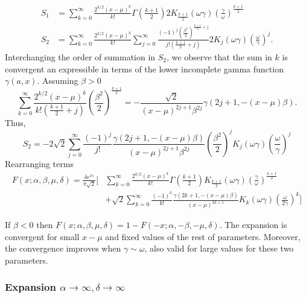 \documentclass[10pt,a4paper,oneside]{article}
\numberwithin{equation}{section}
\begin{document}
\begin{align}
S_1 &= \sum_{k=0}^{\infty}\frac{2^{k/2}(x-\mu)^k}{k!} \Gamma\left(\frac{k+1}{2}\right)2 K_{\frac{k+1}{2}}(\omega \gamma) \left(\frac{\gamma}{\omega}\right)^{\frac{k+1}{2}}\\
S_2 &= \sum_{k=0}^{\infty}\frac{2^{k/2}(x-\mu)^k}{k!}\sum_{j=0}^{\infty}\frac{(-1)^j \left(\frac{\beta^2}{2}\right)^{\frac{k+1}{2}+j}}{j! (\frac{k+1}{2}+ j)} 2 K_j(\omega \gamma) \left(\frac{\omega}{\gamma}\right)^j.
\end{align}
Interchanging the order of summation in $S_2$, we observe that the sum in $k$ is convergent an expressible in terms of the lower incomplete gamma function $\gamma(a, x)$. Assuming $\beta > 0$
\begin{equation}
\sum_{k=0}^{\infty}\frac{2^{k/2}(x-\mu)^k}{k! (\frac{k+1}{2}+ j)} \left(\frac{\beta^2}{2}\right)^{\frac{k+1}{2}} = -\frac{\sqrt{2}}{(x-\mu)^{2j+1}\beta^{2j}} \gamma \left(2j + 1, -(x-\mu)\beta\right).
\end{equation}
Thus,
\begin{equation*}
S_2 = -2\sqrt{2} \sum_{j=0}^{\infty} \frac{(-1)^j}{j!}\frac{\gamma \left(2j + 1, -(x-\mu)\beta\right)}{(x-\mu)^{2j+1}\beta^{2j}} \left(\frac{\beta^2}{2}\right)^j  K_j(\omega \gamma) \left(\frac{\omega}{\gamma}\right)^j
\end{equation*}
Rearranging terms
\begin{align}
F(x;\alpha, \beta, \mu, \delta) = \frac{\delta e^{\delta \gamma}}{\pi \sqrt{2}} \bigg[& \sum_{k=0}^{\infty}\frac{2^{k/2}(x-\mu)^k}{k!} \Gamma\left(\frac{k+1}{2}\right) K_{\frac{k+1}{2}}(\omega \gamma) \left(\frac{\gamma}{\omega}\right)^{\frac{k+1}{2}}\nonumber\\
& + \sqrt{2}\sum_{k=0}^{\infty} \frac{(-1)^k}{k!}\frac{\gamma \left(2k + 1, -(x-\mu)\beta\right)}{(x-\mu)^{2k+ 1}}  K_k(\omega \gamma) \left(\frac{\omega}{2\gamma}\right)^k \bigg]
\end{align}

If $\beta < 0$ then $F(x;\alpha, \beta, \mu, \delta) = 1 - F(-x;\alpha, -\beta, -\mu, \delta)$. The expansion is convergent for small $x-\mu$ and fixed values of the rest of parameters. Moreover, the convergence improves when $\gamma \sim \omega$, also valid for large values for these two parameters.

\subsubsection{Expansion $\alpha \to \infty, \delta \to \infty$}
\end{document}

